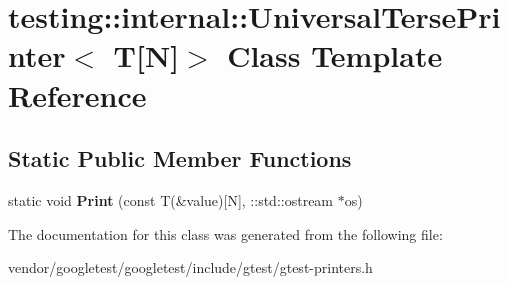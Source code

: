 \hypertarget{classtesting_1_1internal_1_1_universal_terse_printer_3_01_t[_n]_4}{}\section{testing\+:\+:internal\+:\+:Universal\+Terse\+Printer$<$ T\mbox{[}N\mbox{]}$>$ Class Template Reference}
\label{classtesting_1_1internal_1_1_universal_terse_printer_3_01_t[_n]_4}
\subsection*{Static Public Member Functions}
\begin{DoxyCompactItemize}
\item 
\mbox{\label{classtesting_1_1internal_1_1_universal_terse_printer_3_01_t[_n]_4_a9e0ceb62fda7dc46ebcf5f911e459a49}} 
static void {\bfseries Print} (const T(\&value)\mbox{[}N\mbox{]}, \+::std\+::ostream $\ast$os)
\end{DoxyCompactItemize}


The documentation for this class was generated from the following file\+:\begin{DoxyCompactItemize}
\item 
vendor/googletest/googletest/include/gtest/gtest-\/printers.\+h\end{DoxyCompactItemize}
